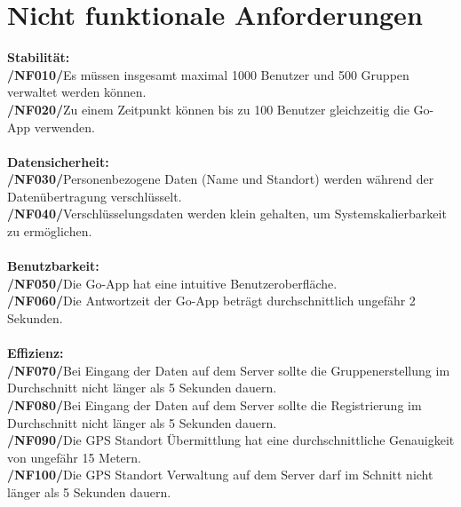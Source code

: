 \section{Nicht funktionale Anforderungen}
  
\textbf{Stabilität:}\\
\textbf{/NF010/}Es müssen insgesamt maximal 1000 Benutzer und 500 Gruppen verwaltet werden können. \\
\textbf{/NF020/}Zu einem Zeitpunkt können bis zu 100 Benutzer gleichzeitig die Go-App verwenden. \\ \\
\textbf{Datensicherheit:}\\
\textbf{/NF030/}Personenbezogene Daten (Name und Standort) werden während der Datenübertragung verschlüsselt.\\
\textbf{/NF040/}Verschlüsselungsdaten werden klein gehalten, um Systemskalierbarkeit zu ermöglichen.\\ \\
\textbf{Benutzbarkeit:}\\
\textbf{/NF050/}Die Go-App hat eine intuitive Benutzeroberfläche.\\
\textbf{/NF060/}Die Antwortzeit der Go-App beträgt durchschnittlich ungefähr 2 Sekunden.\\ \\
\textbf{Effizienz:}\\
\textbf{/NF070/}Bei Eingang der Daten auf dem Server sollte die Gruppenerstellung im Durchschnitt nicht länger als 5 Sekunden dauern.\\
\textbf{/NF080/}Bei Eingang der Daten auf dem Server sollte die Registrierung im Durchschnitt nicht länger als 5 Sekunden dauern.\\
\textbf{/NF090/}Die GPS Standort Übermittlung hat eine durchschnittliche Genauigkeit von ungefähr 15 Metern.\\
\textbf{/NF100/}Die GPS Standort Verwaltung auf dem Server darf im Schnitt nicht länger als 5 Sekunden dauern.\\

